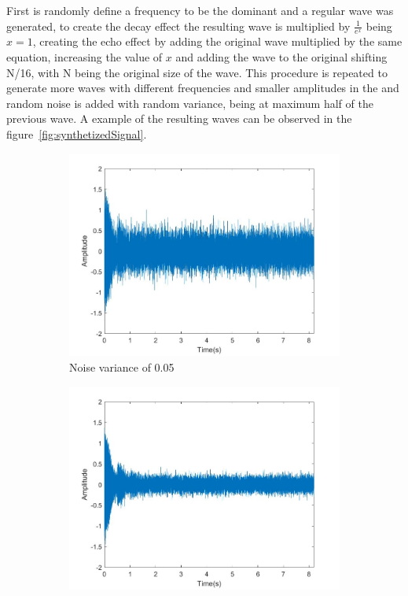 First is randomly define a frequency to be the dominant and a regular wave was generated, to create the decay effect the resulting wave is multiplied by $\frac{1}{e^{x}}$ being $x=1$, creating the echo effect by adding the original wave multiplied by the same equation, increasing the value of $x$ and adding the wave to the original shifting N/16, with N being the original size of the wave. This procedure is repeated to generate more waves with different frequencies and smaller amplitudes in the and random noise is added with random variance, being at maximum half of the previous wave. A example of the resulting waves can be observed in the figure~\ref{fig:synthetizedSignal}.
\begin{figure}[]
    \centering
    \begin{subfigure}{0.45\textwidth}
        \centering
        \includegraphics[width=\linewidth]{Chapters/6CHP/Figures/signal1.jpg}
        \caption{Noise variance of 0.05}{}
    \end{subfigure}
    \begin{subfigure}{0.45\textwidth}
        \centering
        \includegraphics[width=\linewidth]{Chapters/6CHP/Figures/signal2.jpg}

\end{subfigure}
\end{figure}
